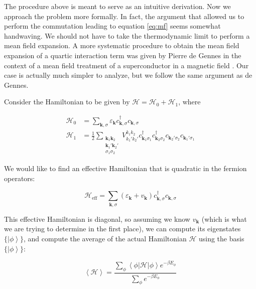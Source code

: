 The procedure above is meant to serve as an intuitive derivation. Now we approach the problem more formally. In fact, the argument that allowed us to perform the commutation leading to equation \ref{eq:mf} seems somewhat handwaving. We should not have to take the thermodynamic limit to perform a mean field expansion. A more systematic procedure to obtain the mean field expansion of a quartic interaction term was given by Pierre de Gennes in the context of a mean field treatment of a superconductor in a magnetic field \cite{deGennes1999}. Our case is actually much simpler to analyze, but we follow the same argument as de Gennes.

Consider the Hamiltonian to be given by $\mathcal{H} = \mathcal{H}_0 + \mathcal{H}_1$, where

\begin{equation}
\begin{split}
\mathcal{H}_0 &= \sum_{\bm k, \sigma} \varepsilon_{\bm k} c_{\bm k, \sigma}^\dagger c_{\bm k, \sigma} \\
\mathcal{H}_1 &= \frac{1}{2} \sum_{\substack{\bm k_1 \bm k_2 \\ \bm k_1' \bm k_2' \\  \sigma_1 \sigma_2}} V_{k_1' k_2'}^{k_1 k_2} c_{\bm k_1 \sigma_1}^\dagger c_{\bm k_2 \sigma_2}^\dagger c_{\bm k_2' \sigma_2} c_{\bm k_1' \sigma_1} 
\end{split}
\end{equation}

We would like to find an effective Hamiltonian that is quadratic in the fermion operators:

\begin{equation}
\mathcal{H}_{\text{eff}} = \sum_{\bm k, \sigma} (\varepsilon_{\bm k} + v_{\bm k} ) c_{\bm k, \sigma}^\dagger c_{\bm k, \sigma}
\end{equation}

This effective Hamiltonian is diagonal, so assuming we know $v_{\bm k}$ (which is what we are trying to determine in the first place), we can compute its eigenstates $\{ \left| \phi \right\rangle \}$, and compute the average of the actual Hamiltonian $\mathcal{H}$ using the basis $\{ \left| \phi \right\rangle \}$:

\begin{equation}\label{eq:avH}
\left\langle \mathcal{H} \right\rangle = \frac{\sum_\phi \left\langle \phi | \mathcal{H} | \phi \right\rangle e^{-\beta E_\phi} }{\sum_\phi e^{-\beta E_\phi} }
\end{equation}

